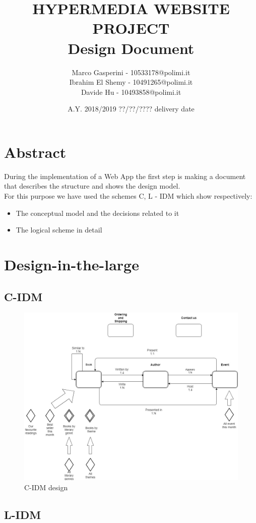 \documentclass[12pt,a4paper]{article}
\title{\textbf{\Huge{HYPERMEDIA WEBSITE PROJECT}} \\ \large Design Document}
\author{Marco Gasperini - 10533178@polimi.it\\ Ibrahim El Shemy - 10491265@polimi.it \\ Davide Hu - 10493858@polimi.it}
\date{A.Y. 2018/2019 ??/??/???? delivery date}
\begin{document}
\maketitle
\newpage
\tableofcontents
\newpage

\section{Abstract}
During the implementation of a Web App the first step is making a document that describes the structure and shows the design model.\\For this purpose we have used the schemes C, L - IDM which show respectively:
\begin{itemize}
\item The conceptual model and the decisions related to it
\item The logical scheme in detail
\end{itemize}

\section{Design-in-the-large}
\subsection{C-IDM}
\begin{figure}[h]
\centering
\includegraphics[width=1.0\linewidth]{imm.jpg}
\caption{C-IDM design}
\label{fig:IDM}
\end{figure}

\subsection{L-IDM}
\end{document}
